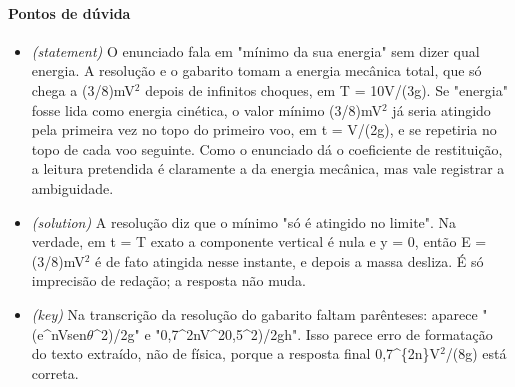\documentclass{article}%
\begin{document}
\paragraph{Pontos de dúvida}%
\begin{itemize}%
\item%
\textit{(statement)} O enunciado fala em "mínimo da sua energia" sem dizer qual energia. A resolução e o gabarito tomam a energia mecânica total, que só chega a (3/8)mV$^2$ depois de infinitos choques, em T = 10V/(3g). Se "energia" fosse lida como energia cinética, o valor mínimo (3/8)mV$^2$ já seria atingido pela primeira vez no topo do primeiro voo, em t = V/(2g), e se repetiria no topo de cada voo seguinte. Como o enunciado dá o coeficiente de restituição, a leitura pretendida é claramente a da energia mecânica, mas vale registrar a ambiguidade.%
\item%
\textit{(solution)} A resolução diz que o mínimo "só é atingido no limite". Na verdade, em t = T exato a componente vertical é nula e y = 0, então E = (3/8)mV$^2$ é de fato atingida nesse instante, e depois a massa desliza. É só imprecisão de redação; a resposta não muda.%
\item%
\textit{(key)} Na transcrição da resolução do gabarito faltam parênteses: aparece "(e\^{}nVsen$\theta$\^{}2)/2g" e "0,7\^{}2nV\^{}20,5\^{}2)/2gh". Isso parece erro de formatação do texto extraído, não de física, porque a resposta final 0,7\^{}\{2n\}V$^2$/(8g) está correta.%
\end{itemize}%
\end{document}
